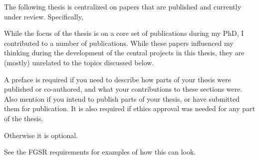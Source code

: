 \documentclass[\main/thesis.tex]{subfiles}
\begin{document}
\begin{preface}


The following thesis is centralized on papers that are published and
currently under review. Specifically, \cite{}


While the focus of the thesis is on a core set of publications during
my PhD, I contributed to a number of publications. While these papers
influenced my thinking during the development of the central projects
in this thesis, they are (mostly) unrelated to the topics discussed
below.




  
A preface is required if you need to describe how parts of your thesis were
published or co-authored, and what your contributions to these sections were.
Also mention if you intend to publish parts of your thesis,
or have submitted them for publication. 
It is also required if ethics approval was needed for any part of the thesis.

Otherwise it is optional.

See the FGSR requirements for examples of how this can look.
\end{preface}
\end{document}
